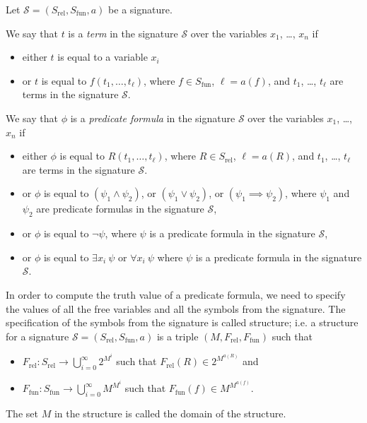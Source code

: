 \begin{definition}
  Let $\mathcal{S} = (S_\mathrm{rel}, S_\mathrm{fun}, a)$ be a signature.

  We say that $t$ is a \emph{term} in the signature $\mathcal{S}$ over the variables
  $x_1$, \dots, $x_n$ if
  \begin{itemize}
    \item either $t$ is equal to a variable $x_i$
    \item or $t$ is equal to $f(t_1, \dots, t_\ell)$, where
      $f \in S_\mathrm{fun}$, $\ell = a(f)$, and $t_1$, \dots, $t_\ell$
      are terms in the signature $\mathcal{S}$.
  \end{itemize}

  We say that $\phi$ is a \emph{predicate formula} in the signature
  $\mathcal{S}$ over the variables $x_1$, \dots, $x_n$  if
  \begin{itemize}
    \item either $\phi$ is equal to $R(t_1, \dots, t_\ell)$, where
      $R \in S_\mathrm{rel}$, $\ell = a(R)$, and $t_1$, \dots, $t_\ell$
      are terms in the signature $\mathcal{S}$.
    \item or $\phi$ is equal to $(\psi_1 \land \psi_2)$, or
      $(\psi_1 \lor \psi_2)$, or $(\psi_1 \implies \psi_2)$,
      where $\psi_1$ and $\psi_2$ are predicate formulas in the signature
      $\mathcal{S}$,
    \item or $\phi$ is equal to $\lnot \psi$, where $\psi$ is a predicate
      formula in the signature $\mathcal{S}$,
    \item or $\phi$ is equal to $\exists x_i~\psi$ or $\forall x_i~\psi$ where
      $\psi$ is a predicate formula in the signature $\mathcal{S}$.
  \end{itemize}
\end{definition}

In order to compute the truth value of a predicate formula, we need to specify
the values of all the free variables and all the symbols from the signature.
The specification of the symbols from the signature is called structure; i.e.
a structure for a signature $\mathcal{S} = (S_\mathrm{rel}, S_\mathrm{fun}, a)$
is a triple $(M, F_\mathrm{rel}, F_\mathrm{fun})$ such that
\begin{itemize}
  \item $F_\mathrm{rel} : S_\mathrm{rel} \to \bigcup_{i = 0}^\infty 2^{M^i}$
    such that $F_\mathrm{rel}(R) \in 2^{M^{a(R)}}$ and
  \item $F_\mathrm{fun} : S_\mathrm{fun} \to \bigcup_{i = 0}^\infty M^{M^i}$
    such that $F_\mathrm{fun}(f) \in M^{M^{a(f)}}$.
\end{itemize}
The set $M$ in the structure is called the domain of the structure.


